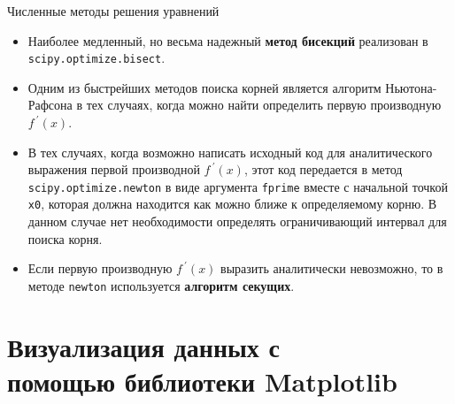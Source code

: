 \documentclass[aspectratio=169, mathserif]{beamer}	%
\begin{document}
\begin{frame}[fragile, label=c]{Численные методы решения уравнений}
\scriptsize
\begin{itemize}
\item Наиболее медленный, но весьма надежный \textcolor{tpugreen}{\textbf{метод бисекций}} реализован в \texttt{scipy.optimize.bisect}.
\item Одним из быстрейших методов поиска корней является алгоритм Ньютона-Рафсона в тех случаях, когда можно найти определить первую производную $f^{\ \prime}(x)$.
\item В тех случаях, когда возможно написать исходный код для аналитического выражения первой производной $f^{\ \prime}(x)$, этот код передается в метод \texttt{scipy.optimize.newton} в виде аргумента \texttt{fprime} вместе с начальной точкой \texttt{x0}, которая должна находится как можно ближе к определяемому корню. В данном случае нет необходимости определять ограничивающий интервал для поиска корня.
\item Если первую производную $f^{\ \prime}(x)$ выразить аналитически невозможно, то в методе \texttt{newton} используется \textcolor{extraorange}{\textbf{алгоритм секущих}}.
\end{itemize}
\vfill
\end{frame}


\section{Визуализация данных с \\ помощью библиотеки Matplotlib}
\sectionframe
\end{document}
